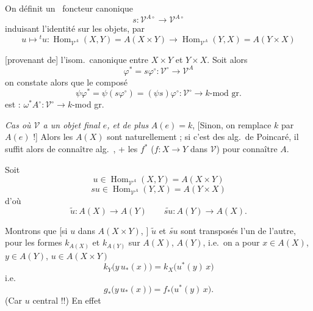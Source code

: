 \documentclass[11pt,a4paper]{article}
\begin{document}

On définit un \ foncteur canonique
\[ s \colon \mathcal{V}^{A\circ} \to \mathcal{V}^{A\circ} \]
induisant l'identité sur les objets, par
\[
u \mapsto {}^{t}u \colon \operatorname{Hom}_{\mathcal{V}^{A}}(X,Y) = A(X \times Y) \to \operatorname{Hom}_{\mathcal{V}^{A}}(Y,X) = A(Y \times X)
\]




[provenant de] l'isom.\ canonique entre $X \times Y$ et $Y \times X$. Soit
alors
\[ \varphi^{*} = s \varphi^{\circ} \colon \mathcal{V}^{\circ} \to \mathcal{V}^{A} \]
on constate alors que le composé
\[
\psi \varphi^{*} = \psi(s \varphi^{\circ}) = (\psi s) \varphi^{\circ} \colon \mathcal{V}^{\circ} \to k\text{-mod gr.}
\]
est  \emph{} :
$\omega^{*} A^{\circ} \colon \mathcal{V}^{\circ} \to k$-mod gr.



\emph{Cas où $\mathcal{V}$ a un objet final $e$, et de plus} $A(e) = k$,
[Sinon, on remplace $k$ par $A(e)$ !] Alors les $A(X)$ sont naturellement
 ; si c'est des alg.\ de Poincaré, il suffit alors de
connaître   alg.\ , + les $f^{*}$
($f \colon X \to Y$ dans $\mathcal{V}$) pour connaître $A$.


Soit
\[ u \in \operatorname{Hom}_{\mathcal{V}^{A}}(X,Y) = A(X \times Y) \]
\[ su \in \operatorname{Hom}_{\mathcal{V}^{A}}(Y,X) = A(Y \times X) \]
d'où
\[ \tilde{u} \colon A(X) \to A(Y) \qquad \widetilde{su} \colon A(Y) \to A(X) . \]

Montrons que [si $u$  dans $A(X \times Y)$, \ill{}]
$\tilde{u}$ et $\widetilde{su}$ sont transposés l'un de l'autre, pour les
formes $k_{A(X)}$ et $k_{A(Y)}$ sur $A(X)$, $A(Y)$, i.e.\ on a pour
$x \in A(X)$, $y \in A(Y)$, $u \in A(X \times Y)$
\[
k_{Y}\bigl( y\, u_{*}(x) \bigr) = k_{X}\bigl( u^{*}(y)\, x \bigr)
\]
i.e.
\[
g_{*}\bigl( y\, u_{*}(x) \bigr) = f_{*}\bigl( u^{*}(y)\, x \bigr) .
\]
(Car $u$ central !!) En effet
\end{document}
